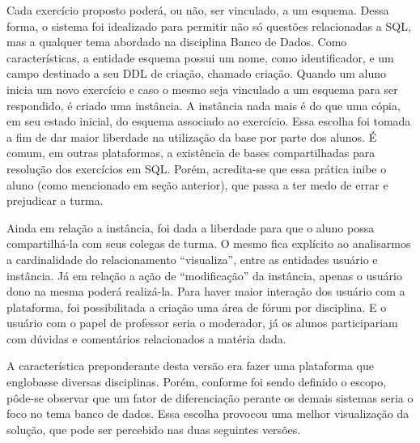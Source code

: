 \documentclass[graduacao,brazil]{ThesisPUC}
\begin{document}
Cada exerc\'{i}cio proposto poder\'{a}, ou n\~{a}o, ser vinculado, a um esquema. Dessa forma, o
sistema foi idealizado para permitir n\~{a}o s\'{o} quest\~{o}es relacionadas a SQL, mas a qualquer tema
abordado na disciplina Banco de Dados. Como caracter\'{i}sticas, a entidade esquema possui um
nome, como identificador, e um campo destinado a seu DDL de cria\c{c}\~{a}o, chamado cria\c{c}\~{a}o.
Quando um aluno inicia um novo exerc\'{i}cio e caso o mesmo seja vinculado a um esquema
para ser respondido, \'{e} criado uma inst\^{a}ncia. A inst\^{a}ncia nada mais \'{e} do que uma c\'{o}pia, em seu
estado inicial, do esquema associado ao exerc\'{i}cio. Essa escolha foi tomada a fim de dar maior
liberdade na utiliza\c{c}\~{a}o da base por parte dos alunos. \'{E} comum, em outras plataformas, a
exist\^{e}ncia de bases compartilhadas para resolu\c{c}\~{a}o dos exerc\'{i}cios em SQL. Por\'{e}m, acredita-se
que essa pr\'{a}tica inibe o aluno (como mencionado em se\c{c}\~{a}o anterior), que passa a ter medo de
errar e prejudicar a turma.

Ainda em rela\c{c}\~{a}o a inst\^{a}ncia, foi dada a liberdade para que o aluno possa compartilh\'{a}-la
com seus colegas de turma. O mesmo fica expl\'{i}cito ao analisarmos a cardinalidade do
relacionamento “visualiza”, entre as entidades usu\'{a}rio e inst\^{a}ncia. J\'{a} em rela\c{c}\~{a}o a a\c{c}\~{a}o de
“modifica\c{c}\~{a}o” da inst\^{a}ncia, apenas o usu\'{a}rio dono na mesma poder\'{a} realiz\'{a}-la.
Para haver maior intera\c{c}\~{a}o dos usu\'{a}rio com a plataforma, foi possibilitada a cria\c{c}\~{a}o uma
\'{a}rea de f\'{o}rum por disciplina. E o usu\'{a}rio com o papel de professor seria o moderador, j\'{a} os alunos
participariam com d\'{u}vidas e coment\'{a}rios relacionados a mat\'{e}ria dada.

A caracter\'{i}stica preponderante desta vers\~{a}o era fazer uma plataforma que englobasse
diversas disciplinas. Por\'{e}m, conforme foi sendo definido o escopo, p\^{o}de-se observar que um fator
de diferencia\c{c}\~{a}o perante os demais sistemas seria o foco no tema banco de dados. Essa escolha
provocou uma melhor visualiza\c{c}\~{a}o da solu\c{c}\~{a}o, que pode ser percebido nas duas seguintes
vers\~{o}es.
\end{document}
